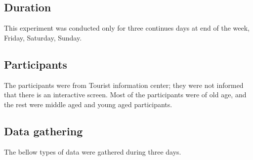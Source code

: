 \subsection{Duration}
This experiment was conducted only for three continues days at end of the week, Friday, Saturday, Sunday.

\subsection{Participants}
The participants were from Tourist information center; they were not informed that there is an interactive screen. Most of the participants were of old age, and the rest were middle aged and young aged participants. 

\subsection{Data gathering}
The bellow types of data were gathered during three days.

